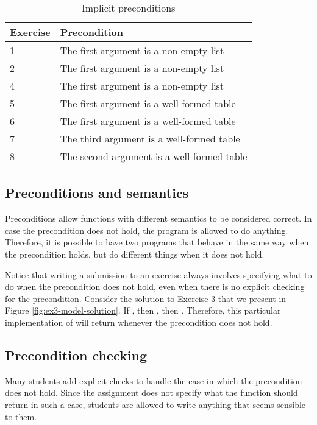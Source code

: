 \begin{table}
\centering
\begin{tabular}{ m{5em} | m{20em} }
Exercise & Precondition \\
\hline
1 & The first argument is a non-empty list \\
\hline
2 & The first argument is a non-empty list \\
\hline
4 & The first argument is a non-empty list \\
\hline
5 & The first argument is a well-formed table \\
\hline
6 & The first argument is a well-formed table \\
\hline
7 & The third argument is a well-formed table \\
\hline
8 & The second argument is a well-formed table
\end{tabular}
\caption{Implicit preconditions}
\label{tb:preconditions-implicit}
\end{table}

\subsection{Preconditions and semantics}
\label{sec:preconditions-and-semantics}

Preconditions allow functions with different semantics to be considered correct. In case the precondition does not hold, the program is allowed to do anything. Therefore, it is possible to have two programs that behave in the same way when the precondition holds, but do different things when it does not hold.

Notice that writing a submission to an exercise always involves specifying what to do when the precondition does not hold, even when there is no explicit checking for the precondition. Consider the solution to Exercise 3 that we present in Figure \ref{fig:ex3-model-solution}. If , then , then . Therefore, this particular implementation of  will return  whenever the precondition does not hold.


\subsection{Precondition checking}

Many students add explicit checks to handle the case in which the precondition does not hold. Since the assignment does not specify what the function should return in such a case, students are allowed to write anything that seems sensible to them.

